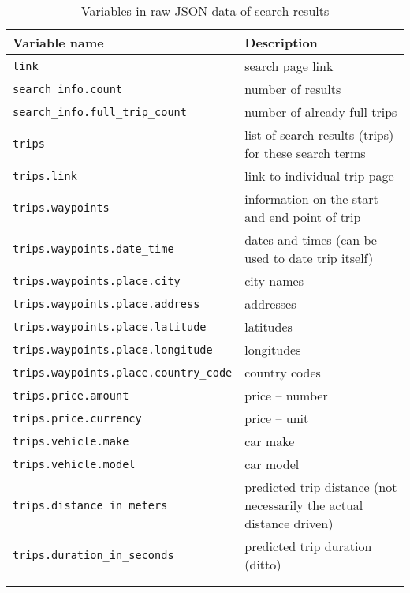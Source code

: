 \documentclass[11pt,a4paper]{article}
\begin{document}
\begin{longtable}{p{}p{}}
	\textbf{Variable name}						& \textbf{Description} 										\\\hline\hline
	\verb|link|                                 & search page link      									\\
	\verb|search_info.count|                    & number of results    										 \\
	\verb|search_info.full_trip_count|          & number of already-full trips      							\\\hline
	\verb|trips|                           		& list of search results (trips) for these search terms     \\
	\verb|trips.link|                           & link to individual trip page      								\\
	\verb|trips.waypoints|            			& information on the start and end point of trip     					\\
	\verb|trips.waypoints.date_time|            & dates and times (can be used to date trip itself)     				\\
	\verb|trips.waypoints.place.city|           & city names      															\\
	\verb|trips.waypoints.place.address|        & addresses     													\\
	\verb|trips.waypoints.place.latitude|       & latitudes      											\\
	\verb|trips.waypoints.place.longitude|      & longitudes     										 		\\
	\verb|trips.waypoints.place.country_code|   & country codes      														\\\hline
	\verb|trips.price.amount|                   & price -- number      										\\
	\verb|trips.price.currency|                 & price -- unit      															\\\hline
	\verb|trips.vehicle.make|                   & car make      														\\
	\verb|trips.vehicle.model|                  & car model      												\\\hline
	\verb|trips.distance_in_meters|             & predicted trip distance (not necessarily the actual distance driven)      \\
	\verb|trips.duration_in_seconds|            & predicted trip duration (ditto)      											\\\hline \\
\caption{Variables in raw JSON data of search results}
\label{tab:tripSearchResults}
\end{longtable}
\end{document}

